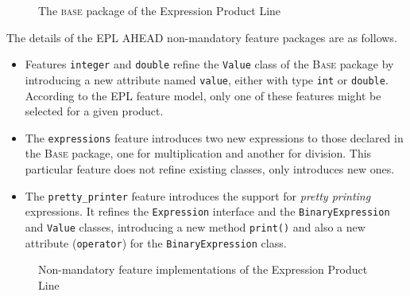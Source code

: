 \begin{figure}[htb]
    \label{fig:epl-base}
    \caption{The \textsc{base} package of the Expression Product Line}
\end{figure} 

The details of the EPL AHEAD non-mandatory feature packages are as follows. 

\begin{itemize}
    \item Features \texttt{integer} and \texttt{double} refine the \texttt{Value} class of 
    the \textsc{Base} package by introducing a new attribute named 
    \texttt{value}, either with type \texttt{int} or \texttt{double}. According 
    to the EPL feature model, only one of these features might be selected for 
    a given product. 

    \item The \texttt{expressions} feature introduces two new expressions 
    to those declared in the \textsc{Base} package, one for multiplication 
    and another for division. This particular feature does not refine 
    existing classes, only introduces new ones. 

    \item The \texttt{pretty\_printer} feature introduces the support for 
    \emph{pretty printing} expressions. It refines the \texttt{Expression} 
    interface and the \texttt{BinaryExpression} and \texttt{Value} classes, 
    introducing a new method \texttt{print()} and also a 
    new attribute (\texttt{operator}) for the \texttt{BinaryExpression} class.
\end{itemize}


\begin{figure}[htb]
\label{fig:epl-features}
\caption{Non-mandatory feature implementations of the Expression Product Line}
\end{figure} 

